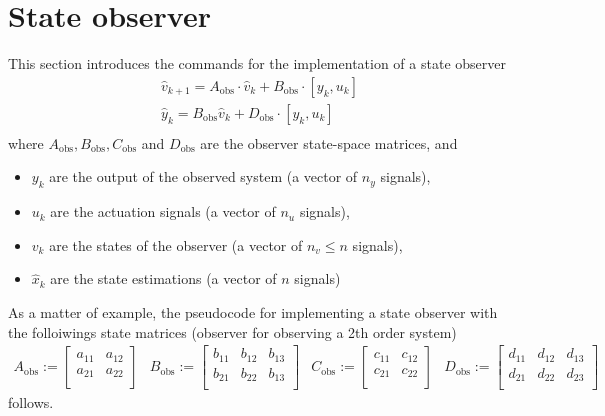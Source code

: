 \documentclass[12pt]{Template_}
\begin{document}
\section{State observer}
This section introduces the commands for the implementation of a state observer
\begin{eqnarray*}
 \hat{v}_{k+1} = A_\mathrm{obs}\cdot \hat{v}_k + B_\mathrm{obs}\cdot [y_k,u_k]\\
 \hat{y}_{k} = 	 B_\mathrm{obs} \hat{v}_k + D_\mathrm{obs}\cdot [y_k,u_k]\\
\end{eqnarray*}
where $A_\mathrm{obs}, B_\mathrm{obs}, C_\mathrm{obs}$ and $D_\mathrm{obs}$ are the observer state-space matrices, and
\begin{itemize}
\item $y_k$ are the output of the observed system (a vector of $n_y$ signals),
\item $u_k$ are the actuation signals (a vector of $n_u$ signals),
\item $v_k$ are the states of the observer (a vector of $n_v\leq n$ signals),
\item $\hat x_k$ are the state estimations (a vector of $n$ signals)
\end{itemize}

As a matter of example, the pseudocode for implementing a state observer with the folloiwings state matrices (observer for observing a 2th order system)
\[
\begin{array}{cccc}
 A_\mathrm{obs}:=\left[ \begin{array}{cc}
 a_{11} & a_{12}\\
 a_{21} & a_{22}\\
 \end{array}
 \right] &
 B_\mathrm{obs}:=\left[ \begin{array}{ccc}
 b_{11} & b_{12} & b_{13}\\
 b_{21} & b_{22} & b_{13}\\
 \end{array}
 \right] &
 C_\mathrm{obs}:=\left[ \begin{array}{ccc}
 c_{11} & c_{12}\\
 c_{21} & c_{22}\\
 \end{array}
 \right] &
 D_\mathrm{obs}:=\left[ \begin{array}{ccc}
 d_{11} & d_{12} & d_{13}\\
 d_{21} & d_{22} & d_{23}\\
 \end{array}
 \right]
 \end{array}
\]
follows.
\end{document}
